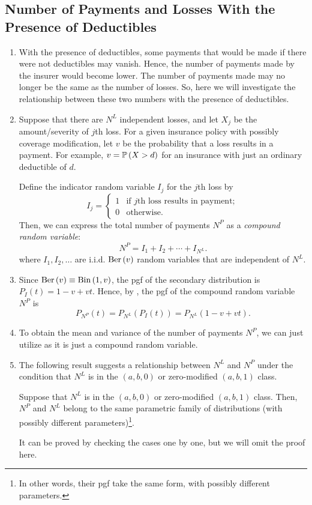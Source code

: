 \subsection{Number of Payments and Losses With the Presence of Deductibles}
\begin{enumerate}
\item With the presence of deductibles, some payments that would be made
if there were not deductibles may vanish. Hence, the number of payments made by
the insurer  would become lower. The number of payments made
may no longer be the same as the number of losses. So, here we will investigate
the relationship between these two numbers with the presence of deductibles.

\item \label{it:nlnp-setting}
Suppose that there are \(N^L\) independent losses, and let \(X_j\) be the
amount/severity of \(j\)th loss. For a given insurance policy with possibly
coverage modification, let \(v\) be the probability that a loss results in a
payment. For example, \(v=\mathbb{P}\left(X>d\right)\) for an insurance with just an ordinary
deductible of \(d\).

Define the indicator random variable \(I_j\) for the \(j\)th loss by
\[
I_j=\begin{cases}
1&\text{if \(j\)th loss results in payment};\\
0&\text{otherwise}.
\end{cases}
\]
Then, we can express the total number of payments \(N^P\) as a \emph{compound
random variable}:
\[
N^P=I_1+I_2+\dotsb+I_{N^L}.
\]
where \(I_1,I_2,\dotsc\) are i.i.d. \(\operatorname{Ber}\left(v\right)\) random variables that are
independent of \(N^L\).

\item Since \(\operatorname{Ber}\left(v\right)\equiv\operatorname{Bin}\left(1,v\right)\), the pgf of the secondary distribution is
\(P_I(t)=1-v+vt\). Hence, by , the pgf of the compound
random variable \(N^P\) is
\[
P_{N^P}(t)=P_{N^L}(P_I(t))=\boxed{P_{N^L}(1-v+vt)}.
\]

\item To obtain the mean and variance of the number of payments \(N^P\), we can
just utilize  as it is just a compound random
variable.

\item The following result suggests a relationship between \(N^L\) and \(N^P\)
under the condition that \(N^L\) is in the \((a,b,0)\) or zero-modified
\((a,b,1)\) class.
\begin{theorem}
\label{thm:ab01-nl-np-same-family}
Suppose that \(N^L\) is in the \((a,b,0)\) or zero-modified \((a,b,1)\) class.
Then, \(N^P\) and \(N^L\) belong to the same parametric family of distributions
(with possibly different parameters)\footnote{In other words, their pgf take
the same form, with possibly different parameters.}.
\end{theorem}
\begin{pf}
It can be proved by checking the cases one by one, but we will omit the proof
here.
\end{pf}
\end{enumerate}
